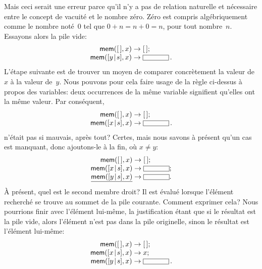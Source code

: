 Mais ceci serait une erreur parce qu'il n'y a pas de relation
naturelle et nécessaire entre le concept de vacuité et le nombre
zéro. Zéro est compris algébriquement comme le nombre noté~\(0\) tel
que \(0 + n = n + 0 = n\), pour tout nombre~\(n\). Essayons alors la
pile vide:
\begin{equation*}
\begin{array}{r@{\;}c@{\;}l}
\fun{mem}(\el,x) & \rightarrow & \el;\\
\fun{mem}(\cons{y}{s},x) & \rightarrow & \fbcode{CCCCC}\,.
\end{array}
\end{equation*}
L'étape suivante est de trouver un moyen de comparer concrètement la
valeur de~\(x\) à la valeur de~\(y\). Nous pouvons pour cela faire
usage de la règle ci-dessus à propos des variables: deux occurrences
de la même variable signifient qu'elles ont la même valeur. Par
conséquent,
\begin{equation*}
\begin{array}{r@{\;}c@{\;}l}
\fun{mem}(\el,x) & \rightarrow & \el;\\
\fun{mem}(\cons{x}{s},x) & \rightarrow & \fbcode{CCCCC}\,.
\end{array}
\end{equation*}
n'était pas si mauvais, après tout?  Certes, mais nous savons à
présent qu'un cas est manquant, donc ajoutons-le à la fin, où \(x \neq
y\):
\begin{equation*}
\begin{array}{r@{\;}c@{\;}l}
\fun{mem}(\el,x) & \rightarrow & \el;\\
\fun{mem}(\cons{x}{s},x) & \rightarrow & \fbcode{CCCCC};\\
\underline{\fun{mem}(\cons{y}{s},x)} & \rightarrow & \fbcode{CCCCC}.
\end{array}
\end{equation*}
À présent, quel est le second membre droit? Il est évalué lorsque
l'élément recherché se trouve au sommet de la pile courante. Comment
exprimer cela? Nous pourrions finir avec l'élément lui-même, la
justification étant que si le résultat est la pile vide, alors
l'élément n'est pas dans la pile originelle, sinon le résultat est
l'élément lui-même:
\begin{equation*}
\begin{array}{r@{\;}c@{\;}l}
\fun{mem}(\el,x) & \rightarrow & \el;\\
\fun{mem}(\cons{x}{s},x) & \rightarrow & x;\\
\fun{mem}(\cons{y}{s},x) & \rightarrow & \fbcode{CCCCC}\,.
\end{array}
\end{equation*}
